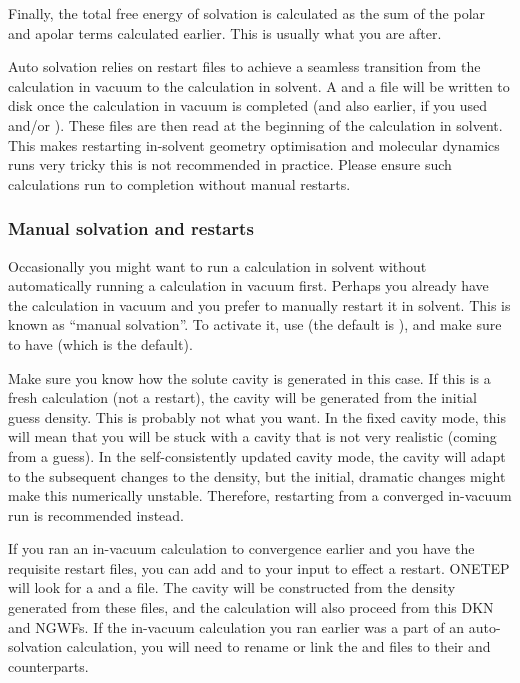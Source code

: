 \documentclass[letterpaper,10pt,english]{sphinxmanual}
\begin{document}
\begin{DUlineblock}{0em}
\item[] 
\item[] Finally, the total free energy of solvation is calculated as the sum
of the polar and apolar terms calculated earlier. This is usually what
you are after.
\end{DUlineblock}

Auto solvation relies on restart files to achieve a seamless transition
from the calculation in vacuum to the calculation in solvent. A
 and a  file will be written to
disk once the calculation in vacuum is completed (and also earlier, if
you used  and/or ). These
files are then read at the beginning of the calculation in solvent. This
makes restarting in-solvent geometry optimisation and molecular dynamics
runs very tricky \textendash{} this is not recommended in practice. Please ensure
such calculations run to completion without manual restarts.


\subsubsection{Manual solvation and restarts}
\label{\detokenize{implicit_solvation_v3:manual-solvation-and-restarts}}
Occasionally you might want to run a calculation in solvent without
automatically running a calculation in vacuum first. Perhaps you already
have the calculation in vacuum and you prefer to manually restart it in
solvent. This is known as “manual solvation”. To activate it, use (the
default is ), and make sure to have  (which
is the default).

Make sure you know how the solute cavity is generated in this case. If
this is a fresh calculation (not a restart), the cavity will be
generated from the initial guess density. This is probably not what you
want. In the fixed cavity mode, this will mean that you will be stuck
with a cavity that is not very realistic (coming from a guess). In the
self-consistently updated cavity mode, the cavity will adapt to the
subsequent changes to the density, but the initial, dramatic changes
might make this numerically unstable. Therefore, restarting from a
converged in-vacuum run is recommended instead.

If you ran an in-vacuum calculation to convergence earlier and you have
the requisite restart files, you can add  and
 to your input to effect a restart. ONETEP will
look for a  and a  file. The cavity will be
constructed from the density generated from these files, and the
calculation will also proceed from this DKN and NGWFs. If the in-vacuum
calculation you ran earlier was a part of an auto-solvation calculation,
you will need to rename or link the  and
 files to their  and
 counterparts.
\end{document}

